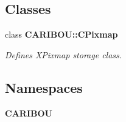 \subsection*{Classes}
\begin{DoxyCompactItemize}
\item 
class {\bf C\+A\+R\+I\+B\+O\+U\+::\+C\+Pixmap}
\begin{DoxyCompactList}\small\item\em Defines X\+Pixmap storage class. \end{DoxyCompactList}\end{DoxyCompactItemize}
\subsection*{Namespaces}
\begin{DoxyCompactItemize}
\item 
 {\bf C\+A\+R\+I\+B\+OU}
\end{DoxyCompactItemize}
